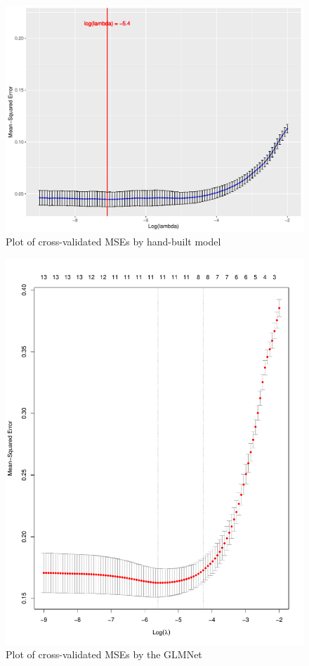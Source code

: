 \documentclass[]{article}
\begin{document}
\begin{figure}[h]

{\centering \includegraphics[width=0.8\linewidth]{plot3} 

}

\caption{Plot of cross-validated MSEs by hand-built model}\label{fig:unnamed-chunk-3}
\end{figure}

\begin{figure}[h]

{\centering \includegraphics[width=0.6\linewidth]{plot4} 

}

\caption{Plot of cross-validated MSEs by the GLMNet}\label{fig:unnamed-chunk-4}
\end{figure}
\end{document}
